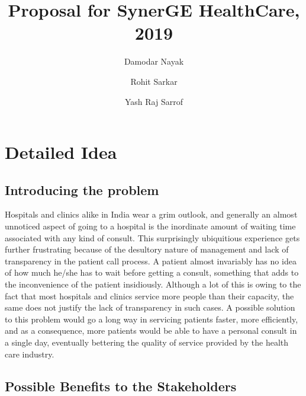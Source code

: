 \documentclass{article}
\begin{document}
\title{Proposal for SynerGE HealthCare, 2019}


\author{ 
	Damodar Nayak  \\ \and 
	Rohit Sarkar  \\  \and
	Yash Raj Sarrof }
\date{}


\maketitle



\section*{Detailed Idea}

\subsection*{Introducing the problem}
Hospitals and clinics alike in India wear a grim outlook, and generally an almost unnoticed aspect of going to a hospital is  the inordinate amount of waiting time associated with any kind of consult. This surprisingly ubiquitious experience gets further frustrating because of the desultory nature of management and lack of transparency in the patient call process. A patient almost invariably has no idea of how much he/she has to wait before getting a consult, something that adds to the inconvenience of the patient insidiously. Although a lot of this is owing to the fact that most hospitals and clinics service more people than their capacity, the same does not justify the lack of transparency in such cases. A possible solution to this problem would go a long way in servicing patients faster, more efficiently, and as a consequence, more patients would be able to have a personal consult in a single day, eventually bettering the quality of service provided by the health care industry.


\subsection*{Possible Benefits to the Stakeholders}
\end{document}
